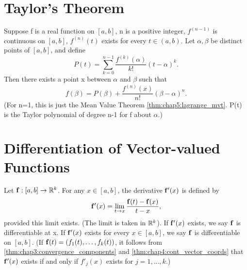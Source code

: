 \section{Taylor's Theorem}
\label{sec:chap5:taylors_theorem}

\begin{theorem} %
  \label{thm:chap5:taylors_theorem}
  Suppose f is a real function on $[a, b]$, n is a positive integer,
  $f^{(n-1)}$ is continuous on $[a, b]$, $f^{(n)}(t)$ exists for
  every $t \in (a, b)$. Let $\alpha, \beta$ be distinct points of
  $[a, b]$, and define
  \[ P(t) = \sum_{k=0}^{n-1} \frac{f^{(k)}(\alpha)}{k!} (t - \alpha)^k. \]
  Then there exists a point x between $\alpha$ and $\beta$ such that
  \[ f(\beta) = P(\beta) + \frac{f^{(n)}(x)}{n!} (\beta - \alpha)^n. \]
  (For n=1, this is just the Mean Value Theorem
    \autoref{thm:chap5:lagrange_mvt}. P(t) is the Taylor polynomial of
  degree n-1 for f about $\alpha$.)
\end{theorem}



\section{Differentiation of Vector-valued Functions}
\label{sec:chap5:diff_vector_valued}

\begin{definition} %
  \label{def:chap5:deriv_vector_valued}
  Let $\mathbf{f}: [a, b] \to \mathbb{R}^k$. For any $x \in [a, b]$, the
  derivative $\mathbf{f}'(x)$ is defined by
  \[ \mathbf{f}'(x) = \lim_{t \to x} \frac{\mathbf{f}(t) - \mathbf{f}(x)}{t - x}, \]
  provided this limit exists. (The limit is taken in $\mathbb{R}^k$). If
  $\mathbf{f}'(x)$ exists, we say $\mathbf{f}$ is differentiable at x. If
  $\mathbf{f}'(x)$ exists for every $x \in [a, b]$, we say $\mathbf{f}$
  is differentiable on $[a, b]$.
  (If $\mathbf{f}(t) = (f_1(t), \dots, f_k(t))$, it follows from
    \autoref{thm:chap3:convergence_components} and
    \autoref{thm:chap4:cont_vector_coords} that $\mathbf{f}'(x)$ exists
  if and only if $f'_j(x)$ exists for $j=1, \dots, k$.)
\end{definition}

